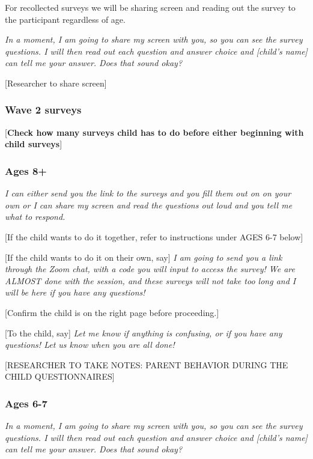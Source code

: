 \documentclass[
]{book}
\begin{document}
For recollected surveys we will be sharing screen and reading out the survey to the participant regardless of age.

\emph{In a moment, I am going to share my screen with you, so you can see the survey questions. I will then read out each question and answer choice and {[}child's name{]} can tell me your answer. Does that sound okay? }

{[}Researcher to share screen{]}

\hypertarget{wave-2-surveys}{%
\subsubsection{Wave 2 surveys}\label{wave-2-surveys}}

{[}\textbf{Check how many surveys child has to do before either beginning with child surveys}{]}

\hypertarget{ages-8-1}{%
\subsubsection{Ages 8+}\label{ages-8-1}}

\emph{I can either send you the link to the surveys and you fill them out on on your own or I can share my screen and read the questions out loud and you tell me what to respond.}

{[}If the child wants to do it together, refer to instructions under AGES 6-7 below{]}

{[}If the child wants to do it on their own, say{]} \emph{I am going to send you a link through the Zoom chat, with a code you will input to access the survey! We are ALMOST done with the session, and these surveys will not take too long and I will be here if you have any questions! }

{[}Confirm the child is on the right page before proceeding.{]}

{[}To the child, say{]} \emph{Let me know if anything is confusing, or if you have any questions! Let us know when you are all done!}

{[}RESEARCHER TO TAKE NOTES: PARENT BEHAVIOR DURING THE CHILD QUESTIONNAIRES{]}

\hypertarget{ages-6-7-1}{%
\subsubsection{Ages 6-7}\label{ages-6-7-1}}

\emph{In a moment, I am going to share my screen with you, so you can see the survey questions. I will then read out each question and answer choice and {[}child's name{]} can tell me your answer. Does that sound okay? }
\end{document}
